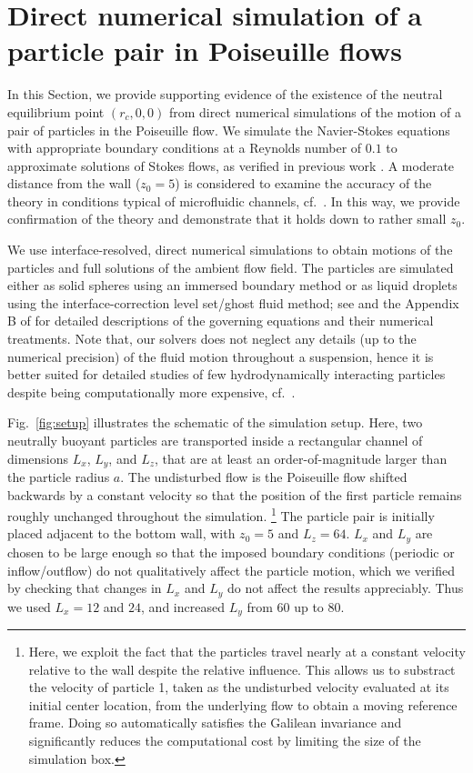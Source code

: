 \section{Direct numerical simulation of a particle pair in Poiseuille flows}\label{dns}

In this Section, we provide supporting evidence of the existence of the neutral equilibrium point $(r_c, 0, 0)$ from direct numerical simulations of the motion of a pair of particles in the Poiseuille flow. We simulate the Navier-Stokes equations with appropriate boundary conditions at a Reynolds number of $0.1$ to approximate solutions of Stokes flows, as verified in previous work \citep{ibm,Fouxon_2017}. A moderate distance from the wall ($z_0=5$) is considered to examine the accuracy of the theory in conditions typical of microfluidic channels, cf.\ \cite{tabeling,flow-assist}. In this way, we provide confirmation of the theory and demonstrate that it holds down to rather small $z_0$.

We use interface-resolved, direct numerical simulations to obtain motions of the particles and full solutions of the ambient flow field. The particles are simulated either as solid spheres using an immersed boundary method or as liquid droplets using the interface-correction level set/ghost fluid method; see \cite{ibm,icls,flow-assist} and the Appendix B of \cite{Fouxon_2017} for detailed descriptions of the governing equations and their numerical treatments. Note that, our solvers does not neglect any details (up to the numerical precision) of the fluid motion throughout a suspension, hence it is better suited for detailed studies of few hydrodynamically interacting particles despite being computationally more expensive, cf.\ \cite{Swan_Brady_2007}.

Fig.\ \ref{fig:setup} illustrates the schematic of the simulation setup. Here, two neutrally buoyant particles are transported inside a rectangular channel of dimensions $L_x$, $L_y$, and $L_z$, that are at least an order-of-magnitude larger than the particle radius $a$. The undisturbed flow is the Poiseuille flow shifted backwards by a constant velocity so that the position of the first particle remains roughly unchanged throughout the simulation.%
\footnote{Here, we exploit the fact that the particles travel nearly at a constant velocity relative to the wall despite the relative influence. This allows us to substract the velocity of particle 1, taken as the undisturbed velocity evaluated at its initial center location, from the underlying flow to obtain a moving reference frame. Doing so automatically satisfies the Galilean invariance and significantly reduces the computational cost by limiting the size of the simulation box.}
The particle pair is initially placed adjacent to the bottom wall, with $z_0=5$ and $L_z=64$. $L_x$ and $L_y$ are chosen to be large enough so that the imposed boundary conditions (periodic or inflow/outflow) do not qualitatively affect the particle motion, which we verified by checking that changes in $L_x$ and $L_y$ do not affect the results appreciably. Thus we used $L_x=12$ and $24$, and increased $L_y$ from $60$ up to $80$.

